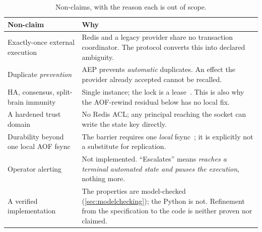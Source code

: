 \begin{table}[t]
\centering
\caption{Non-claims, with the reason each is out of scope.}
\label{tab:nonclaims}
\small
\begin{tabular}{@{}p{}p{}@{}}
\toprule
Non-claim & Why \\
\midrule
Exactly-once external execution
  & Redis and a legacy provider share no transaction coordinator. The
    protocol converts this into declared ambiguity. \\
Duplicate \emph{prevention}
  & AEP prevents \emph{automatic} duplicates. An effect the provider already
    accepted cannot be recalled. \\
HA, consensus, split-brain immunity
  & Single instance; the lock is a lease~\cite{gray1989leases}. This is also
    why the AOF-rewind residual below has no local fix. \\
A hardened trust domain
  & No Redis ACL; any principal reaching the socket can write the state key
    directly. \\
Durability beyond one local AOF fsync
  & The barrier requires one \emph{local} fsync~\cite{redis-waitaof}; it is
    explicitly not a substitute for replication. \\
Operator alerting
  & Not implemented. ``Escalates'' means \emph{reaches a terminal automated
    state and pauses the execution}, nothing more. \\
A verified implementation
  & The properties are model-checked (\cref{sec:modelchecking}); the Python is
    not. Refinement from the specification to the code is neither proven nor
    claimed. \\
\bottomrule
\end{tabular}
\end{table}
